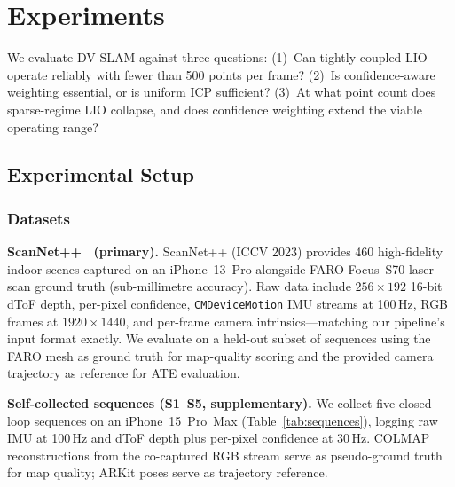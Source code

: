 \section{Experiments}
\label{sec:experiments}

We evaluate DV-SLAM against three questions:
(1)~Can tightly-coupled LIO operate reliably with fewer than 500 points per
frame?
(2)~Is confidence-aware weighting essential, or is uniform ICP sufficient?
(3)~At what point count does sparse-regime LIO collapse, and does
confidence weighting extend the viable operating range?

\subsection{Experimental Setup}
\label{sec:setup}

\subsubsection{Datasets}

\textbf{ScanNet++~\cite{yeshwanth2023scannetpp} (primary).}
ScanNet++ (ICCV 2023) provides 460 high-fidelity indoor scenes captured on
an iPhone~13~Pro alongside FARO Focus~S70 laser-scan ground truth
(sub-millimetre accuracy).
Raw data include $256 \times 192$ 16-bit dToF depth, per-pixel confidence,
\texttt{CMDeviceMotion} IMU streams at 100\,Hz, RGB frames at
$1920 \times 1440$, and per-frame camera intrinsics---matching our pipeline's
input format exactly.
We evaluate on a held-out subset of sequences using the FARO mesh as
ground truth for map-quality scoring and the provided camera trajectory as
reference for ATE evaluation.

\textbf{Self-collected sequences (S1--S5, supplementary).}
We collect five closed-loop sequences on an iPhone~15~Pro~Max
(Table~\ref{tab:sequences}), logging raw IMU at 100\,Hz and dToF depth plus
per-pixel confidence at 30\,Hz.
COLMAP~\cite{schoenberger2016sfm} reconstructions from the co-captured RGB
stream serve as pseudo-ground truth for map quality; ARKit poses serve as
trajectory reference.

